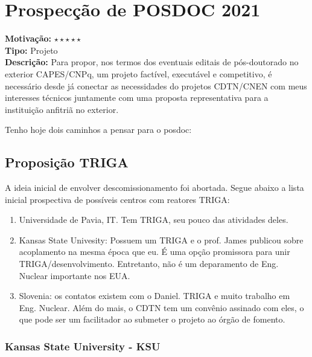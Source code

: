 \chapter{Prospecção de POSDOC 2021}
\label{posdoc}

\textbf{Motivação:} $\star\star\star\star\star$\\

\textbf{Tipo:} Projeto\\

\textbf{Descrição:} Para propor, nos termos dos eventuais editais de pós-doutorado no exterior CAPES/CNPq, um projeto factível, executável e competitivo, é necessário 
desde já conectar as necessidades do projetos CDTN/CNEN com meus interesses técnicos juntamente com uma proposta representativa para a instituição anfitriã 
no exterior.

Tenho hoje dois caminhos a pensar para o posdoc:

\section{Proposição TRIGA}
\label{TRIGA}
 
A ideia inicial de envolver descomissionamento foi abortada. Segue abaixo a lista inicial prospectiva de possíveis centros com reatores TRIGA:
 \begin{enumerate}
 	\item Universidade de Pavia, IT. Tem TRIGA, seu pouco das atividades deles.
 	\item Kansas State Univesity: Possuem um TRIGA e o prof. James publicou sobre acoplamento na mesma época que eu. É uma opção promissora para unir TRIGA/desenvolvimento. Entretanto, não é um deparamento de Eng. Nuclear importante nos EUA.
 	\item Slovenia: os contatos existem com o Daniel. TRIGA e muito trabalho em Eng. Nuclear. Além do mais, o CDTN tem um convênio assinado com eles, o que pode 
 	ser um facilitador ao submeter o projeto ao órgão de fomento.
 \end{enumerate}

\subsection{Kansas State University - KSU}

